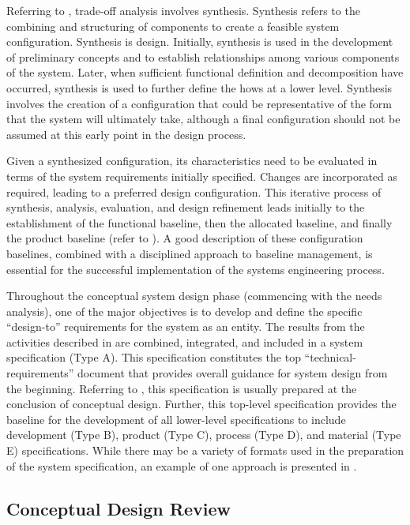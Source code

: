 Referring to , trade-off analysis involves synthesis. Synthesis refers to the combining and structuring of components to create a feasible system configuration. Synthesis is design. Initially, synthesis is used in the development of preliminary concepts and to establish relationships among various components of the system. Later, when sufficient functional definition and decomposition have occurred, synthesis is used to further define the hows at a lower level. Synthesis involves the creation of a configuration that could be representative of the form that the system will ultimately take, although a final configuration should not be assumed at this early point in the design process.

Given a synthesized configuration, its characteristics need to be evaluated in terms of the system requirements initially specified. Changes are incorporated as required, leading to a preferred design configuration. This iterative process of synthesis, analysis, evaluation, and design refinement leads initially to the establishment of the functional baseline, then the allocated baseline, and finally the product baseline (refer to ). A good description of these configuration baselines, combined with a disciplined approach to baseline management, is essential for the successful implementation of the systems engineering process.

Throughout the conceptual system design phase (commencing with the needs analysis), one of the major objectives is to develop and define the specific ``design-to'' requirements for the system as an entity. The results from the activities described in are combined, integrated, and included in a system specification (Type A). This specification constitutes the top ``technical-requirements'' document that provides overall guidance for system design from the beginning. Referring to , this specification is usually prepared at the conclusion of conceptual design. Further, this top-level specification provides the baseline for the development of all lower-level specifications to include development (Type B), product (Type C), process (Type D), and material (Type E) specifications. While there may be a variety of formats used in the preparation of the system specification, an example of one approach is presented in .

\subsection{Conceptual Design Review}


